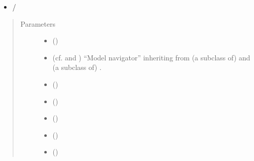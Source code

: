 \documentclass[letterpaper,10pt,english]{sphinxmanual}
\begin{document}
\begin{fulllineitems}
\begin{description}
\begin{itemize}
\item {} 
{\hyperref[\detokenize{index:Generator.Generator.process_query}]{}} / {\hyperref[\detokenize{index:Generator.GenerationHandler.process_query}]{}}

\end{itemize}

\end{description}
\begin{quote}\begin{description}
\item[{Parameters}] \leavevmode\begin{itemize}
\item {} 
 () \textendash{} 

\item {} 
 (cf.  and {\hyperref[\detokenize{index:module-MetaModelNavigator}]{}}) \textendash{} “Model navigator” inheriting from (a subclass of) {\hyperref[\detokenize{index:Model.Model}]{}} and (a subclass of) {\hyperref[\detokenize{index:Navigator.Navigator}]{}}.

\item {} 
 () \textendash{} 

\item {} 
 ({\hyperref[\detokenize{index:Query.Query}]{}}) \textendash{} 

\item {} 
 () \textendash{} 

\item {} 
 () \textendash{} 

\item {} 
 () \textendash{} 


\end{itemize}
\end{description}
\end{quote}
\end{fulllineitems}
\end{document}
